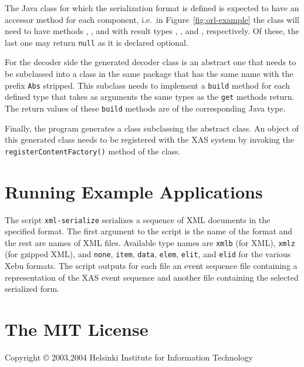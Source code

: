 \documentclass[draft]{article}
\begin{document}
The Java class for which the serialization format is defined is
expected to have an accessor method for each component, i.e.\ in
Figure~\ref{fig:orl-example} the class  will
need to have methods , , and
 with result types ,
, and , respectively.
Of these, the last one may return \texttt{null} as it is declared
optional.

For the decoder side the generated decoder class is an abstract one
that needs to be subclassed into a class in the same package that has
the same name with the prefix \texttt{Abs} stripped.  This subclass
needs to implement a \texttt{build} method for each defined type that
takes as arguments the same types as the \texttt{get} methods return.
The return values of these \texttt{build} methods are of the
corresponding Java type.

Finally, the  program generates a class subclassing the
 abstract class.  An
object of this generated class needs to be registered with the XAS
system by invoking the \texttt{register\-Con\-tent\-Factory()} method
of the  class.

\section{Running Example Applications}
\label{sec:running_xml_hip}

The script \texttt{xml-serialize} serializes a sequence of XML
documents in the specified format.  The first argument to the script
is the name of the format and the rest are names of XML files.
Available type names are \texttt{xmlb} (for XML), \texttt{xmlz} (for
gzipped XML), and \texttt{none}, \texttt{item}, \texttt{data},
\texttt{elem}, \texttt{elit}, and \texttt{elid} for the various Xebu
formats.  The script outputs for each file an event sequence file
containing a representation of the XAS event sequence and another file
containing the selected serialized form.

\appendix

\section{The MIT License}
\label{app:mit-license}

Copyright \copyright{} 2003,2004 Helsinki Institute for Information
Technology
\end{document}
